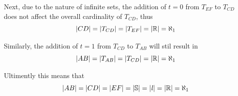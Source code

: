 \documentclass[]{article}
\newcommand{\R}{\mathbb{R}}
\begin{document}
Next, due to the nature of infinite sets, the addition of $t=0$ from $T_{EF}$ to $T_{CD}$ 
does not affect the overall cardinality of $T_{CD}$, thus
$$\abs{CD} = \abs{T_{CD}} = \abs{T_{EF}} = \abs{\R} = \aleph_1$$

Similarly, the addition of $t=1$ from $T_{CD}$ to $T_{AB}$ will stil result in 
$$\abs{AB} = \abs{T_{AB}} = \abs{T_{CD}} = \abs{\R} = \aleph_1$$

Ultimently this means that
$$\abs{AB} = \abs{CD} = \abs{EF} = \abs{\mathbb{S}} = \abs{\mathit{l}} = \abs{\R} = \aleph_1$$
\end{document}
